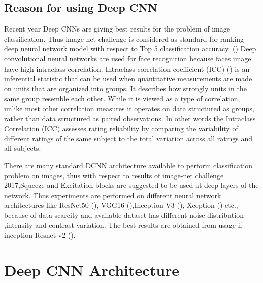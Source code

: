 \documentclass[a4paper,12pt, twoside]{NITKReport}
\begin{document}
\subsection{Reason for using Deep CNN}
\par Recent year Deep CNNs are giving best results for the problem of image classification. Thus image-net challenge is considered as standard for ranking deep neural network model with respect to Top 5 classification accuracy. (\cite{NIPS2012_4824}) Deep convolutional neural networks are used for face recognition because faces image have high intraclass correlation. Intraclass correlation coefficient (ICC) (\cite{koch1982intraclass}) is an inferential statistic that can be used when quantitative measurements are made on units that are organized into groups. It describes how strongly units in the same group resemble each other. While it is viewed as a type of correlation, unlike most other correlation measures it operates on data structured as groups, rather than data structured as paired observations. In other words the Intraclass Correlation (ICC) assesses rating reliability by comparing the variability of different ratings of the same subject to the total variation across all ratings and all subjects.
\par There are many standard DCNN architecture available to perform classification problem on images, thus with respect to results of image-net challenge 2017,Squeeze and Excitation blocks are suggested to be used at deep layers of the network. Thus experiments are performed on different neural network architectures like ResNet50 (\cite{he2016deep}), VGG16 (\cite{DBLP:journals/corr/SimonyanZ14a}),Inception V3 (\cite{DBLP:journals/corr/SzegedyVISW15}), Xception (\cite{DBLP:journals/corr/Chollet16a}) etc., because of data scarcity and available dataset has different noise distribution ,intensity and contrast variation. The best results are obtained from usage if inception-Resnet v2 (\cite{DBLP:journals/corr/SzegedyIV16}).

\section{Deep CNN Architecture}
\end{document}
